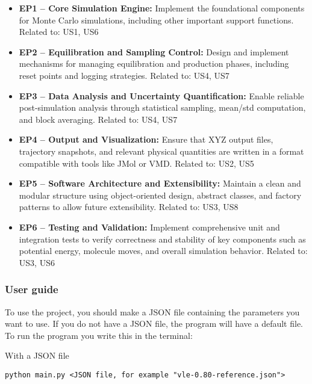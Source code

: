 \documentclass{article}
\begin{document}
\begin{itemize}
    \item \textbf{EP1 – Core Simulation Engine:} Implement the foundational components for Monte Carlo simulations, including other important support functions. Related to: US1, US6
    
    \item \textbf{EP2 – Equilibration and Sampling Control:} Design and implement mechanisms for managing equilibration and production phases, including reset points and logging strategies. Related to: US4, US7
    
    \item \textbf{EP3 – Data Analysis and Uncertainty Quantification:} Enable reliable post-simulation analysis through statistical sampling, mean/std computation, and block averaging. Related to: US4, US7
    
    \item \textbf{EP4 – Output and Visualization:} Ensure that XYZ output files, trajectory snapshots, and relevant physical quantities are written in a format compatible with tools like JMol or VMD. Related to: US2, US5
    
    \item \textbf{EP5 – Software Architecture and Extensibility:} Maintain a clean and modular structure using object-oriented design, abstract classes, and factory patterns to allow future extensibility. Related to: US3, US8
    
    \item \textbf{EP6 – Testing and Validation:} Implement comprehensive unit and integration tests to verify correctness and stability of key components such as potential energy, molecule moves, and overall simulation behavior. Related to: US3, US6
\end{itemize}

\subsubsection*{User guide}

To use the project, you should make a JSON file containing the parameters you want to use. If you do not have a JSON file, the program will have a default file. To run the program you write this in the terminal:

With a JSON file

\begin{verbatim}
python main.py <JSON file, for example "vle-0.80-reference.json">
\end{verbatim}
\end{document}
